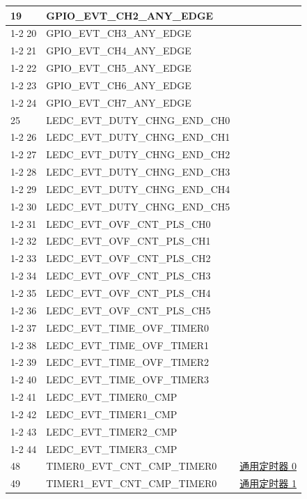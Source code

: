 \documentclass[main\_\_CN.tex]{subfiles}
\begin{document}
\begin{longtable}{ | l | l | l | }
19  & GPIO\_EVT\_CH2\_ANY\_EDGE &  \\ \cline{1-2}
20  & GPIO\_EVT\_CH3\_ANY\_EDGE &  \\ \cline{1-2}
21  & GPIO\_EVT\_CH4\_ANY\_EDGE &  \\ \cline{1-2}
22  & GPIO\_EVT\_CH5\_ANY\_EDGE &  \\ \cline{1-2}
23  & GPIO\_EVT\_CH6\_ANY\_EDGE &  \\ \cline{1-2}
24  & GPIO\_EVT\_CH7\_ANY\_EDGE &  \\ \hline
25  & LEDC\_EVT\_DUTY\_CHNG\_END\_CH0  & \nameref{mod:ledpwm}\\ \cline{1-2}
26  & LEDC\_EVT\_DUTY\_CHNG\_END\_CH1  & \\ \cline{1-2}
27  & LEDC\_EVT\_DUTY\_CHNG\_END\_CH2  & \\ \cline{1-2}
28  & LEDC\_EVT\_DUTY\_CHNG\_END\_CH3  & \\ \cline{1-2}
29  & LEDC\_EVT\_DUTY\_CHNG\_END\_CH4  & \\ \cline{1-2}
30  & LEDC\_EVT\_DUTY\_CHNG\_END\_CH5  & \\ \cline{1-2}
31  & LEDC\_EVT\_OVF\_CNT\_PLS\_CH0    & \\ \cline{1-2}
32  & LEDC\_EVT\_OVF\_CNT\_PLS\_CH1    & \\ \cline{1-2}
33  & LEDC\_EVT\_OVF\_CNT\_PLS\_CH2    & \\ \cline{1-2}
34  & LEDC\_EVT\_OVF\_CNT\_PLS\_CH3    & \\ \cline{1-2}
35  & LEDC\_EVT\_OVF\_CNT\_PLS\_CH4    & \\ \cline{1-2}
36  & LEDC\_EVT\_OVF\_CNT\_PLS\_CH5    & \\ \cline{1-2}
37  & LEDC\_EVT\_TIME\_OVF\_TIMER0     & \\ \cline{1-2}
38  & LEDC\_EVT\_TIME\_OVF\_TIMER1     & \\ \cline{1-2}
39  & LEDC\_EVT\_TIME\_OVF\_TIMER2     & \\ \cline{1-2}
40  & LEDC\_EVT\_TIME\_OVF\_TIMER3     & \\ \cline{1-2}
41  & LEDC\_EVT\_TIMER0\_CMP    & \\ \cline{1-2}
42  & LEDC\_EVT\_TIMER1\_CMP    & \\ \cline{1-2}
43  & LEDC\_EVT\_TIMER2\_CMP    & \\ \cline{1-2}
44  & LEDC\_EVT\_TIMER3\_CMP    & \\ \hline
48  & TIMER0\_EVT\_CNT\_CMP\_TIMER0    & \hyperref[mod:timg]{通用定时器 0}   \\ \hline
49  & TIMER1\_EVT\_CNT\_CMP\_TIMER0    & \hyperref[mod:timg]{通用定时器 1}   \\ \hline

\end{longtable}
\end{document}
